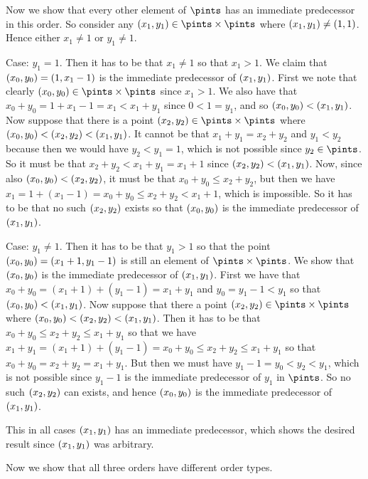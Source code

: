 {{    Now we show that every other element of $\pints$ has an immediate predecessor in this order.
    So consider any $\ppt{1} \in \pintss$ where $(x_{1}, y_{1}) \neq (1,1)$.
    Hence either $x_1 \neq 1$ or $y_1 \neq 1$.

    Case: $y_1 = 1$.
    Then it has to be that $x_1 \neq 1$ so that $x_1 > 1$.
    We claim that $(x_{0}, y_{0}) = (1, x_1-1)$ is the immediate predecessor of $(x_{1}, y_{1})$.
    First we note that clearly $\ppt{0} \in \pintss$ since $x_1 > 1$.
    We also have that $x_0 + y_0 = 1 + x_1 - 1 = x_1 < x_1 + y_1$ since $0 < 1 = y_1$, and so $(x_{0}, y_{0}) < (x_{1}, y_{1})$.
    Now suppose that there is a point $\ppt{2} \in \pintss$ where $(x_{0}, y_{0}) < (x_{2}, y_{2}) < (x_{1}, y_{1})$.
    It cannot be that $x_1+y_1 = x_2+y_2$ and $y_1 < y_2$ because then we would have $y_2 < y_1 = 1$, which is not possible since $y_2 \in \pints$.
    So it must be that $x_2+y_2 < x_1+y_1 = x_1+1$ since $(x_{2}, y_{2}) < (x_{1}, y_{1})$.
    Now, since also $(x_{0}, y_{0}) < (x_{2}, y_{2})$, it must be that $x_0+y_0 \leq x_2+y_2$, but then we have $x_1 = 1 + (x_1 - 1) = x_0 + y_0 \leq x_2+y_2 < x_1+1$, which is impossible.
    So it has to be that no such $(x_{2}, y_{2})$ exists so that $(x_{0}, y_{0})$ is the immediate predecessor of $(x_{1}, y_{1})$.

    Case: $y_1 \neq 1$.
    Then it has to be that $y_1 > 1$ so that the point $(x_{0}, y_{0}) = (x_1+1,y_1-1)$ is still an element of $\pintss$.
    We show that $(x_{0}, y_{0})$ is the immediate predecessor of $(x_{1}, y_{1})$.
    First we have that $x_0+y_0 = (x_1+1) + (y_1-1) = x_1 + y_1$ and $y_0 = y_1-1 < y_1$ so that $(x_{0}, y_{0}) < (x_{1}, y_{1})$.
    Now suppose that there a point $\ppt{2} \in \pintss$ where $(x_{0}, y_{0}) < (x_{2}, y_{2}) < (x_{1}, y_{1})$.
    Then it has to be that $x_0 + y_0 \leq x_2+y_2 \leq x_1+y_1$ so that we have $x_1+y_1 = (x_1+1)+(y_1-1) = x_0+y_0 \leq x_2+y_2 \leq x_1+y_1$ so that $x_0+y_0 = x_2+y_2 = x_1+y_1$.
    But then we must have $y_1 - 1 = y_0 < y_2 < y_1$, which is not possible since $y_1-1$ is the immediate predecessor of $y_1$ in $\pints$.
    So no such $(x_{2}, y_{2})$ can exists, and hence $(x_{0}, y_{0})$ is the immediate predecessor of $(x_{1}, y_{1})$.

    This in all cases $(x_{1}, y_{1})$ has an immediate predecessor, which shows the desired result since $(x_{1}, y_{1})$ was arbitrary.
  }

  Now we show that all three orders have different order types.
}
